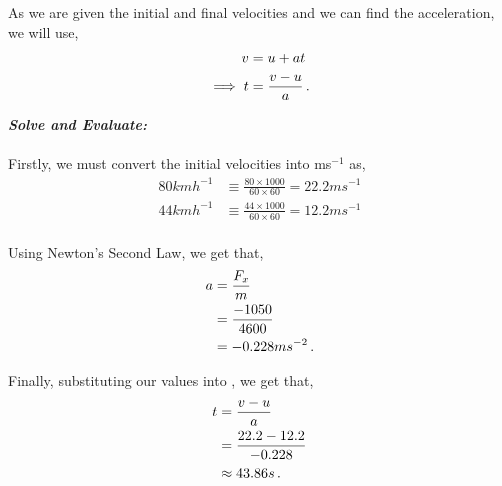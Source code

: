 \begin{subquestions}
\begin{subsubquestions}
As we are given the initial and final velocities and we can find the acceleration, we will use,
\begin{align}
	v & = u + at \nonumber \\
	\implies t & = \frac{v-u}{a} \label{2016:q5:MotionEqn}\,.
\end{align}




\textbf{\textit{Solve and Evaluate:}} \\ \\
Firstly, we must convert the initial velocities into ms$^{-1}$ as,
\begin{align}
	80kmh^{-1} & \equiv \frac{80 \times 1000}{60 \times 60} = 22.2ms^{-1} \\
	44kmh^{-1} & \equiv \frac{44 \times 1000}{60 \times 60} = 12.2ms^{-1} \\
\end{align}

Using Newton's Second Law, we get that,
\begin{align}
	a & = \frac{F_x}{m} \nonumber \\
	  & = \frac{-1050}{4600} \nonumber \\
	  & = -0.228ms^{-2} \,.
\end{align}

Finally, substituting our values into , we get that,
\begin{align}
	t & = \frac{v-u}{a} \nonumber \\
	  & = \frac{22.2-12.2}{-0.228} \nonumber \\
	  & \approx 43.86s \,.
\end{align}

\end{subsubquestions}

\end{subquestions}
